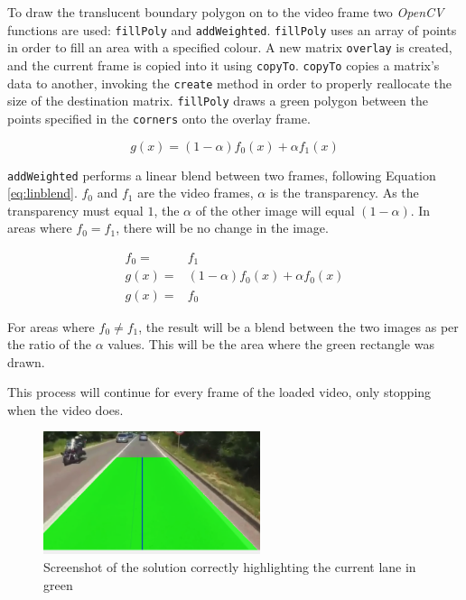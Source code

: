 \documentclass[conference]{IEEEtran}
\begin{document}
To draw the translucent boundary polygon on to the video frame two \textit{OpenCV} functions are used: \verb|fillPoly| and \verb|addWeighted|. \verb|fillPoly| uses an array of points in order to fill an area with a specified colour\cite{fillPoly}. A new matrix \verb|overlay| is created, and the current frame is copied into it using \verb|copyTo|. \verb|copyTo| copies a matrix's data to another, invoking the \verb|create| method in order to properly reallocate the size of the destination matrix\cite{copyTo}. \verb|fillPoly| draws a green polygon between the points specified in the \verb|corners| onto the overlay frame.

\begin{equation}\label{eq:linblend}
g(x) = (1-\alpha)f_0(x)+\alpha f_1 (x)
\end{equation}

\verb|addWeighted| performs a linear blend between two frames, following Equation \ref{eq:linblend}. $f_0$ and $f_1$ are the video frames, $\alpha$ is the transparency. As the transparency must equal $1$, the $\alpha$ of the other image will equal $(1-\alpha)$. In areas where $f_0 = f_1$, there will be no change in the image.

\begin{equation}\label{xx}
\begin{split}
f_0=& f_1\\
g(x)=&(1-\alpha)f_0(x)+\alpha f_0 (x) \\
g(x)=& f_0 
\end{split}
\end{equation}

For areas where $f_0 \neq f_1$, the result will be a blend between the two images as per the ratio of the $\alpha$ values. This will be the area where the green rectangle was drawn.

This process will continue for every frame of the loaded video, only stopping when the video does.

\begin{figure}[H]
\centering
\includegraphics[width=2.5in]{video1_screenshot}
\caption{Screenshot of the solution correctly highlighting the current lane in green}
\label{fig:t5working}
\end{figure}
\end{document}
